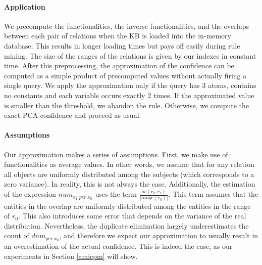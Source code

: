 {\paragraph{Application} We precompute the functionalities,
the inverse functionalities, and the overlaps between each pair of relations when the KB is loaded
into the in-memory database. This results in longer loading times but pays off easily during rule mining. The size of the ranges of the relations is given by
our indexes in constant time.
After this preprocessing, the approximation of the confidence can be computed as a simple product of precomputed values without actually firing a single query.
We apply the approximation only if the query has 3 atoms, contains no constants and each variable occurs exactly 2 times.
If the approximated value is smaller than the threshold, we abandon the rule.
Otherwise, we compute the exact PCA confidence and proceed as usual.

\paragraph{Assumptions} Our approximation makes a series of assumptions.
First, we make use of functionalities as average values. In other words, we assume that for any relation all objects are uniformly distributed among the subjects (which corresponds to a zero variance).
In reality, this is not always the case. Additionally,
the estimation of the expression $num_{x_1 \; per \; x_0}$ uses the term $\frac{ov(r_0, r_1)}{|range(r_0)|}$.
This term assumes that the entities in the overlap are uniformly distributed among the entities in the range of $r_0$. This also introduces some error that depends on the variance of the real distribution.
Nevertheless, the duplicate elimination largely underestimates the count of $dnm_{per\; x_0}$, and therefore we expect our approximation to usually
result in an overestimation of the actual confidence. This is indeed the case, as our experiments in Section \ref{amiepm} will show.

}
